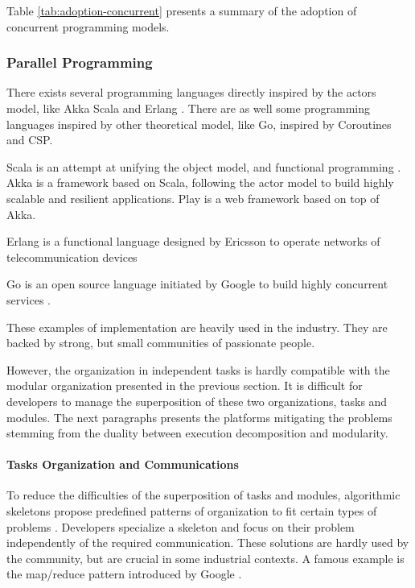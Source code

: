 Table \ref{tab:adoption-concurrent} presents a summary of the adoption of concurrent programming models.


\subsubsection{Parallel Programming}

There exists several programming languages directly inspired by the actors model, like Akka Scala and Erlang \cite{JoeArmstrong}.
There are as well some programming languages inspired by other theoretical model, like Go, inspired by Coroutines and CSP.

Scala is an attempt at unifying the object model, and functional programming \cite{Odersky2004}.
Akka is a framework based on Scala, following the actor model to build highly scalable and resilient applications.
Play is a web framework based on top of Akka.

Erlang is a functional language designed by Ericsson to operate networks of telecommunication devices \cite{Armstrong1993,Nelson2004,Armstrong2014}

Go is an open source language initiated by Google to build highly concurrent services .

These examples of implementation are heavily used in the industry.
They are backed by strong, but small communities of passionate people.

However, the organization in independent tasks is hardly compatible with the modular organization presented in the previous section.
It is difficult for developers to manage the superposition of these two organizations, tasks and modules.
The next paragraphs presents the platforms mitigating the problems stemming from the duality between execution decomposition and modularity.

\paragraph{Tasks Organization and Communications}

To reduce the difficulties of the superposition of tasks and modules, algorithmic skeletons propose predefined patterns of organization to fit certain types of problems \cite{Cole1988, Dean2008, McCool2010, Gonzalez-Velez2010}.
Developers specialize a skeleton and focus on their problem independently of the required communication.
These solutions are hardly used by the community, but are crucial in some industrial contexts.
A famous example is the map/reduce pattern introduced by Google \cite{Dean2008}.

